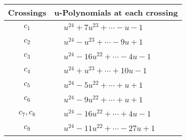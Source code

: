 \documentclass[1p]{elsarticle_modified}
\theoremstyle{definition}
\begin{document}
\begin{tabular}{m{50pt}|m{274pt}}
Crossings & \hspace{64pt}u-Polynomials at each crossing \\
\hline $$\begin{aligned}c_{1}\end{aligned}$$&$\begin{aligned}
&u^{24}+7 u^{23}+\cdots- u-1
\end{aligned}$\\
\hline $$\begin{aligned}c_{2}\end{aligned}$$&$\begin{aligned}
&u^{24}- u^{23}+\cdots-9 u+1
\end{aligned}$\\
\hline $$\begin{aligned}c_{3}\end{aligned}$$&$\begin{aligned}
&u^{24}-16 u^{22}+\cdots-4 u-1
\end{aligned}$\\
\hline $$\begin{aligned}c_{4}\end{aligned}$$&$\begin{aligned}
&u^{24}+u^{23}+\cdots+10 u-1
\end{aligned}$\\
\hline $$\begin{aligned}c_{5}\end{aligned}$$&$\begin{aligned}
&u^{24}-5 u^{22}+\cdots+u+1
\end{aligned}$\\
\hline $$\begin{aligned}c_{6}\end{aligned}$$&$\begin{aligned}
&u^{24}-9 u^{22}+\cdots+u+1
\end{aligned}$\\
\hline $$\begin{aligned}c_{7},c_{8}\end{aligned}$$&$\begin{aligned}
&u^{24}-16 u^{22}+\cdots+4 u-1
\end{aligned}$\\
\hline $$\begin{aligned}c_{9}\end{aligned}$$&$\begin{aligned}
&u^{24}-11 u^{22}+\cdots-27 u+1
\end{aligned}$\\

\end{tabular}
\end{document}
